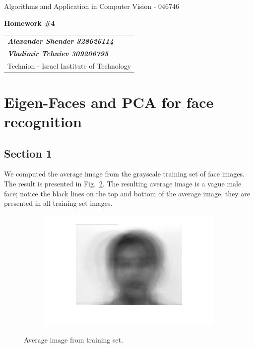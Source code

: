 \documentclass[a4paper]{iacas}
\begin{document}
\begin{center}
	\large Algorithms and Application in Computer Vision - 046746
\end{center}
\begin{center}
	\large\textbf{Homework \#4}
\end{center}


\begin{tabular}{l}
	\\
	{\bf\textit{Alexander Shender 328626114}} \\
	{\bf\textit{Vladimir Tchuiev 309206795}} \\
	Technion - Israel Institute of Technology
\end{tabular}


\vspace{2em}

\section{Eigen-Faces and PCA for face recognition}


\subsection{Section 1}

We computed the average image from the grayscale training set of face images. The result is presented in Fig.~\ref{fig:100}. The resulting average image is a vague male face; notice the black lines on the top and bottom of the average image, they are presented in all training set images.

\begin{figure}[!htbp]
	\centering
	\begin{subfigure}[b]{0.6\textwidth}
		\includegraphics[width=\textwidth]{101.jpg}
		\label{fig:101}
	\end{subfigure}
	
	\caption{Average image from training set.}
	\label{fig:100}
\end{figure}
\end{document}
